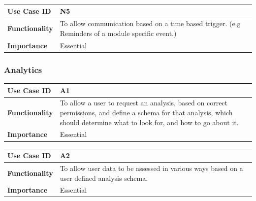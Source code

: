 \documentclass[a4paper,12pt]{article}
\begin{document}
        	\begin{center}
        		\begin{tabularx}{\textwidth}{ |X|X| }
        			
        			\hline
        			\textbf{Use Case ID} & N5 \\
        			\hline
        			\textbf{Functionality} & To allow communication based on a time based trigger. (e.g Reminders of a module specific event.) \\
        			\hline
        			\textbf{Importance} & Essential \\
        			\hline
        			
        		\end{tabularx}
        	\end{center}
        
        	\subsubsection{Analytics}
        	
        	\begin{center}
        		\begin{tabularx}{\textwidth}{ |X|X| }
        			
        			\hline
        			\textbf{Use Case ID} & A1 \\
        			\hline
        			\textbf{Functionality} & To allow a user to request an analysis, based on correct permissions, and define a schema for that analysis, which should determine what to look for, and how to go about it. \\
        			\hline
        			\textbf{Importance} & Essential \\
        			\hline
        			
        		\end{tabularx}
        	\end{center}
        	
        	\begin{center}
        		\begin{tabularx}{\textwidth}{ |X|X| }
        			
        			\hline
        			\textbf{Use Case ID} & A2 \\
        			\hline
        			\textbf{Functionality} & To allow user data to be assessed in various ways based on a user defined analysis schema. \\
        			\hline
        			\textbf{Importance} & Essential \\
        			\hline
        			
        		\end{tabularx}
        	\end{center}
        	
\end{document}
